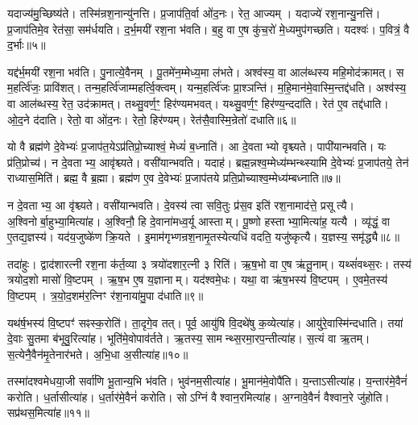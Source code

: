 यदाज्य॑मु॒च्छिष्य॑ते।
तस्मि॑न्रश॒नान्यु॑नत्ति।
प्र॒जाप॑ति॒र्वा ओ॑द॒नः।
रेत॒ आज्यम्।
यदाज्ये॑ रश॒नान्यु॒नत्ति॑।
प्र॒जाप॑तिमे॒व रेत॑सा॒ सम॑र्धयति।
द॒र्भ॒मयी॑ रश॒ना भ॑वति।
ब॒हु वा ए॒ष कु॑च॒रो॑ मे॒ध्यमुप॑गच्छति।
यदश्वः॑।
प॒वित्रं॒ वै द॒र्भाः॥५॥

यद्द॑र्भ॒मयी॑ रश॒ना भव॑ति।
पु॒नात्ये॒वैनम्।
पू॒तमे॑न॒म्मेध्य॒मा ल॑भते।
अश्व॑स्य॒ वा आल॑ब्धस्य महि॒मोद॑क्रामत्।
स म॒हर्त्वि॑जः॒ प्रावि॑शत्।
तन्म॒हर्त्वि॑जाम्महर्त्वि॒क्त्वम्।
यन्म॒हर्त्वि॑जः प्रा॒श्ञन्ति॑।
म॒हि॒मान॑मे॒वास्मि॒न्तद्द॑धति।
अश्व॑स्य॒ वा आल॑ब्धस्य॒ रेत॒ उद॑क्रामत्।
तथ्सु॒वर्ण॒ꣳ॒ हिर॑ण्यमभवत्।
यथ्सु॒वर्ण॒ꣳ॒ हिर॑ण्य॒न्ददा॑ति।
रेत॑ ए॒व तद्द॑धाति।
ओ॒द॒ने द॑दाति।
रेतो॒ वा ओ॑द॒नः।
रेतो॒ हिर॑ण्यम्।
रेत॑सै॒वास्मि॒न्रेतो॑ दधाति॥६॥\anuvakamend[द॒धा॒ति॒ रु॒न्धे॒ द॒र्भा अ॑भव॒थ्षट् च॑]

यो वै ब्रह्म॑णे दे॒वेभ्यः॑ प्र॒जाप॑त॒ये\-ऽप्र॑तिप्रो॒च्याश्वं॒ मेध्यं॑ ब॒ध्नाति॑।
आ दे॒वताभ्यो वृश्च्यते।
पापी॑यान्भवति।
यः प्र॑ति॒प्रोच्य॑।
न दे॒वताभ्य॒ आवृ॑श्च्यते।
वसी॑यान्भवति।
यदाह॑।
ब्रह्म॒न्नश्व॒म्मेध्य॑म्भन्थ्स्यामि दे॒वेभ्यः॑ प्र॒जाप॑तये॒ तेन॑ राध्यास॒मिति॑।
ब्रह्म॒ वै ब्र॒ह्मा।
ब्रह्म॑ण ए॒व दे॒वेभ्यः॑ प्र॒जाप॑तये प्रति॒प्रोच्याश्व॒म्मेध्य॑म्बध्नाति॥७॥

न दे॒वताभ्य॒ आ वृ॑श्च्यते।
वसी॑यान्भवति।
दे॒वस्य॑ त्वा सवि॒तुः प्र॑स॒व इति॑ रश॒नामाद॑त्ते॒ प्रसूत्यै।
अ॒श्विनोर्बा॒हुभ्या॒मित्या॑ह।
अ॒श्विनौ॒ हि दे॒वाना॑मध्व॒र्यू आस्ताम्।
पू॒ष्णो हस्ताभ्या॒मित्या॑ह॒ यत्यै।
व्यृ॑द्धं॒ वा ए॒तद्य॒ज्ञस्य॑।
यद॑य॒जुष्के॑ण क्रि॒यते।
इ॒माम॑गृभ्णन्रश॒नामृ॒तस्येत्यधि॑ वदति॒ यजु॑ष्कृत्यै।
य॒ज्ञस्य॒ समृ॑द्ध्यै॥८॥

तदा॑हुः।
द्वाद॑शारत्नी रश॒ना क॑र्त॒व्या ३ त्रयो॑दशार॒त्नी ३ रिति॑।
ऋ॒ष॒भो वा ए॒ष ऋ॑तू॒नाम्।
यथ्सं॑वथ्स॒रः।
तस्य॑ त्रयोद॒शो मासो॑ वि॒ष्टपम्।
ऋ॒ष॒भ ए॒ष य॒ज्ञानाम्।
यद॑श्वमे॒धः।
यथा॒ वा ऋ॑ष॒भस्य॑ वि॒ष्टपम्।
ए॒वमे॒तस्य॑ वि॒ष्टपम्।
त्र॒यो॒द॒शम॑र॒त्निꣳ र॑श॒नाया॑मु॒पा द॑धाति॥९॥

यथ॑र्\mbox{}ष॒भस्य॑ वि॒ष्टपꣳ॑ सꣴस्क॒रोति॑।
ता॒दृगे॒व तत्।
पूर्व॒ आयु॑षि वि॒दथे॑षु क॒व्येत्या॑ह।
आयु॑रे॒वास्मि॑न्दधाति।
तया॑ दे॒वाः सु॒तमा ब॑भूवु॒रित्या॑ह।
भूति॑मे॒वोपाव॑र्तते।
ऋ॒तस्य॒ सामन्थ्स॒रमा॒रप॒न्तीत्या॑ह।
स॒त्यं वा ऋ॒तम्।
स॒त्येनै॒वैन॑मृ॒तेनार॑भते।
अ॒भि॒धा अ॒सीत्या॑ह॥१०॥

तस्मा॑दश्वमेधया॒जी सर्वा॑णि भू॒तान्य॒भि भ॑वति।
भुव॑नम॒सीत्या॑ह।
भू॒मान॑मे॒वोपै॑ति।
य॒न्ता\-ऽसीत्या॑ह।
य॒न्तार॑मे॒वैनं॑ करोति।
ध॒र्तासीत्या॑ह।
ध॒र्तार॑मे॒वैनं॑ करोति।
सोऽग्निं वैश्वान॒रमित्या॑ह।
अ॒ग्नावे॒वैनं॑ वैश्वान॒रे जु॑होति।
सप्र॑थस॒मित्या॑ह॥११॥

